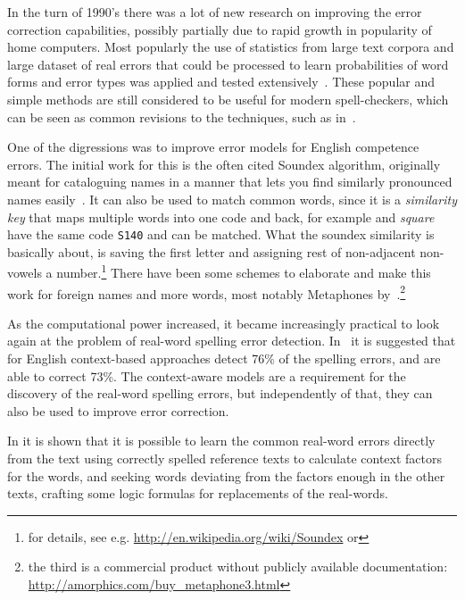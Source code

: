 \documentclass[officiallayout]{unihelcompling}
\newcommand\misspelt{\bgroup\markoverwith
{\textcolor{red}{\lower3.5pt\hbox{\sixly \char58}}}\ULon}
\begin{document}
In the turn of 1990's there was a lot of new research on improving the error
correction capabilities, possibly partially due to rapid growth in popularity
of home computers. Most popularly the use of statistics from large text corpora
and large dataset of real errors that could be processed to learn probabilities
of word forms and error types was applied and tested
extensively~\citep{kernighan1990spelling,church1991probability}. These popular
and simple methods are still considered to be useful for modern spell-checkers,
which can be seen as common revisions to the techniques, such as
in~\citet{brill2000improved}.

One of the digressions was to improve error models for English competence
errors. The initial work for this is the often cited Soundex algorithm,
originally meant for cataloguing names in a manner that lets you find similarly
pronounced names easily~\citep{russell1918soundex}. It can also be used to
match common words, since it is a \emph{similarity key} that maps multiple
words into one code and back, for example \misspelt{squer} and \emph{square}
have the same code \texttt{S140} and can be matched.
What the soundex similarity
is basically about, is saving the first letter and assigning rest of
non-adjacent non-vowels a number.\footnote{for details, see e.g. \url{http://en.wikipedia.org/wiki/Soundex} or } There have been some schemes to elaborate and
make this work for foreign names and more words, most notably Metaphones
by~\citet{philips1990hanging,philips2000double}.\footnote{the third is a
commercial product without publicly available documentation:
\url{http://amorphics.com/buy_metaphone3.html}}

As the computational power increased, it became increasingly practical to look
again at the problem of real-word spelling error detection.
In~\citet{mays1991context} it is suggested that for English context-based
approaches detect 76\% of the spelling errors, and are able to correct 73\%.
The context-aware models are a requirement for the discovery of the real-word
spelling errors, but independently of that, they can also be used to improve
error correction. 

In \citet{al2006learning} it is shown that it is possible to learn the common
real-word errors directly from the text using correctly spelled reference texts
to calculate context factors for the words, and seeking words deviating from
the factors enough in the other texts, crafting some logic formulas for
replacements of the real-words.
\end{document}
